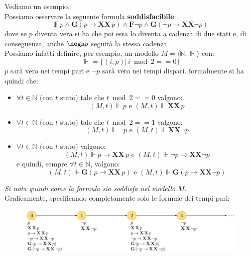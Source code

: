 \documentclass[a4paper,12pt, oneside]{book}
\begin{document}
\begin{esempio}
  Vediamo un esempio.\\
  Possiamo osservare la seguente formula \textbf{soddisfacibile}:
  \[\mathbf{F}\,p\land \mathbf{G}(p\to\mathbf{XX}\,p)\land\mathbf{F}\neg p\land
    \mathbf{G}(\neg p\to\mathbf{XX}\neg p)\]
  dove se $p$ diventa vera si ha che poi essa lo diventa a cadenza di due stati
  e, di conseguenza, anche $\negn p$ seguirà la stessa cadenza.\\ 
  Possiamo infatti definire, per esempio, un modello $M=\langle
  \mathbb{N},\Vdash\rangle$ con:
  \[\Vdash=\{(i,p)|\,i\bmod 2==0\}\]
  $p$ sarà vero nei tempi pari e $\neg p$ sarà vero nei tempi dispari.
  formalmente si ha quindi che:
  \begin{itemize}
    \item $\forall t\in\mathbb{N}$ (con $t$ stato) tale che $t\bmod 2 == 0$
    valgono:
    \[(M,t)\Vdash p \mbox{ e } (M,t)\Vdash\mathbf{XX}\,p\]
    \item $\forall t\in\mathbb{N}$ (con $t$ stato) tale che $t\bmod 2 == 1$
    valgono:
    \[(M,t)\Vdash \neg p \mbox{ e } (M,t)\Vdash\mathbf{XX}\neg p\]
    \item $\forall t\in\mathbb{N}$ (con $t$ stato) valgono:
    \[(M,t)\Vdash p \to \mathbf{XX}\,p \mbox{ e }(M,t)\Vdash \neg p\to
      \mathbf{XX}\neg p\]
    e quindi, sempre $\forall t\in\mathbb{N}$, valgono:
    \[(M,t)\Vdash \mathbf{G}(p\to\mathbf{XX}\,p)\mbox{ e
      }(M,t)\Vdash\mathbf{G}(p\to\mathbf{XX}\neg p)\]
  \end{itemize}
  \emph{Si nota quindi come la formula sia soddisfa nel modello} $M$.\\
  Graficamente, specificando completamente solo le formule dei tempi pari:
  \begin{figure}[H]
    \centering
    \includegraphics[scale = 0.4]{img/pltl20.jpg}
  \end{figure}
\end{esempio}
\end{document}
